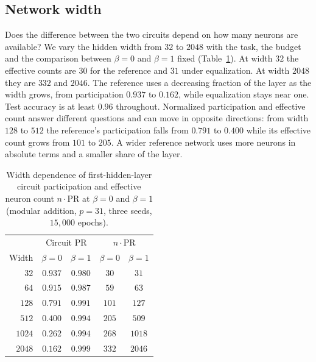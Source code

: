 \documentclass{article} %
\begin{document}
\subsection{Network width}
\label{app:arch}
Does the difference between the two circuits depend on how many neurons are available? We vary the hidden width from $32$ to $2048$ with the task, the budget and the comparison between $\beta = 0$ and $\beta = 1$ fixed (Table~\ref{tab:widths}). At width $32$ the effective counts are $30$ for the reference and $31$ under equalization. At width $2048$ they are $332$ and $2046$. The reference uses a decreasing fraction of the layer as the width grows, from participation $0.937$ to $0.162$, while equalization stays near one. Test accuracy is at least $0.96$ throughout. Normalized participation and effective count answer different questions and can move in opposite directions: from width $128$ to $512$ the reference's participation falls from $0.791$ to $0.400$ while its effective count grows from $101$ to $205$. A wider reference network uses more neurons in absolute terms and a smaller share of the layer.

\begin{table}[!ht]
\caption{Width dependence of first-hidden-layer circuit participation and effective neuron count $n \cdot \mathrm{PR}$ at $\beta = 0$ and $\beta = 1$ (modular addition, $p=31$, three seeds, $15{,}000$ epochs).}
\label{tab:widths}
\begin{center}
\small
\begin{tabular}{rcccc}
\toprule
& \multicolumn{2}{c}{Circuit PR} & \multicolumn{2}{c}{$n \cdot \mathrm{PR}$} \\
Width & $\beta=0$ & $\beta=1$ & $\beta=0$ & $\beta=1$ \\
\midrule
$32$   & $0.937$ & $0.980$ & $30$  & $31$   \\
$64$   & $0.915$ & $0.987$ & $59$  & $63$   \\
$128$  & $0.791$ & $0.991$ & $101$ & $127$  \\
$512$  & $0.400$ & $0.994$ & $205$ & $509$  \\
$1024$ & $0.262$ & $0.994$ & $268$ & $1018$ \\
$2048$ & $0.162$ & $0.999$ & $332$ & $2046$ \\
\bottomrule
\end{tabular}
\end{center}
\end{table}
\end{document}
